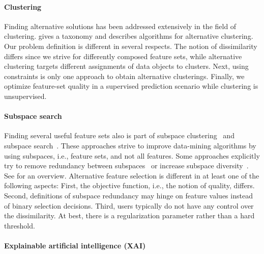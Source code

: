 \documentclass[iicol, sn-basic, Numbered]{sn-jnl} %
\theoremstyle{plain}
\theoremstyle{definition}
\begin{document}
\paragraph{Clustering}

Finding alternative solutions has been addressed extensively in the field of clustering.
\cite{bailey2014alternative} gives a taxonomy and describes algorithms for alternative clustering.
Our problem definition is different in several respects.
The notion of dissimilarity differs since we strive for differently composed feature sets, while alternative clustering targets different assignments of data objects to clusters.
Next, using constraints is only one approach to obtain alternative clusterings.
Finally, we optimize feature-set quality in a supervised prediction scenario while clustering is unsupervised.

\paragraph{Subspace search}

Finding several useful feature sets also is part of subspace clustering~\cite{hu2018subspace, mueller2009relevant} and subspace search~\cite{fouche2021efficient, nguyen20134s, trittenbach2019dimension}.
These approaches strive to improve data-mining algorithms by using subspaces, i.e., feature sets, and not all features.
Some approaches explicitly try to remove redundancy between subspaces~\cite{mueller2009relevant, nguyen20134s} or increase subspace diversity~\cite{fouche2021efficient, trittenbach2019dimension}.
See \cite{hu2018subspace} for an overview.
Alternative feature selection is different in at least one of the following aspects:
First, the objective function, i.e., the notion of quality, differs.
Second, definitions of subspace redundancy may hinge on feature values instead of binary selection decisions.
Third, users typically do not have any control over the dissimilarity. 
At best, there is a regularization parameter rather than a hard threshold.

\paragraph{Explainable artificial intelligence (XAI)}
\end{document}

